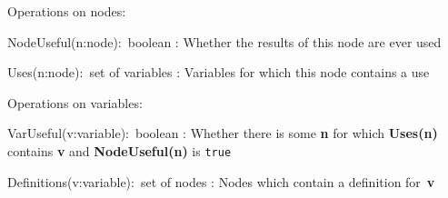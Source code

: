 Operations on nodes:
\begin{tightdesc}
\item[NodeUseful(n:node):~boolean]
:	Whether the results of this node are ever used
\item[Uses(n:node):~set of variables]
:	Variables for which this node contains a use
\end{tightdesc}

Operations on variables:
\begin{tightdesc}
\item[VarUseful(v:variable):~boolean]
:	Whether there is some \textbf{n} for which 
        \textbf{Uses(n)} contains \textbf{v} and
        \textbf{NodeUseful(n)} is \texttt{true}
\item[Definitions(v:variable):~set of nodes]
:	Nodes which contain a definition for~\textbf{v}
\end{tightdesc}
